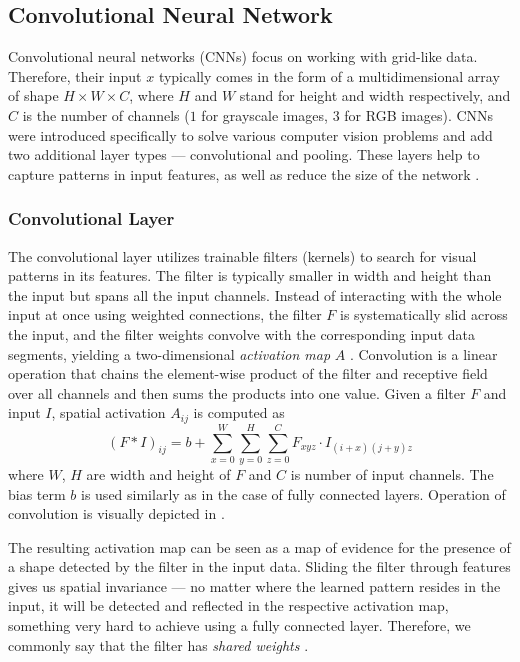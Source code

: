 \subsection*{Convolutional Neural Network}
Convolutional neural networks (CNNs) focus on working with grid-like data.
Therefore, their input $x$ typically comes in the form of a multidimensional array of shape $H \times W \times C$, where $H$ and $W$ stand for height and width respectively, and $C$ is the number of channels ($1$ for grayscale images, $3$ for RGB images).
CNNs were introduced specifically to solve various computer vision problems and add two additional layer types --- convolutional and pooling.
These layers help to capture patterns in input features, as well as reduce the size of the network \cite{cnns}. 


\subsubsection{Convolutional Layer}

The convolutional layer utilizes trainable filters (kernels) to search for visual patterns in its features.
The filter is typically smaller in width and height than the input but spans all the input channels.
Instead of interacting with the whole input at once using weighted connections, the filter $F$ is systematically slid across the input, and the filter weights convolve with the corresponding input data segments, yielding a two-dimensional \emph{activation map} $A$ \cite{goodfellow}.
Convolution is a linear operation that chains the element-wise product of the filter and receptive field over all channels and then sums the products into one value. Given a filter $F$ and input $I$, spatial activation $A_{ij}$ is computed as 
\begin{equation}
    (F * I)_{ij} = b + \sum_{x=0}^{W} \sum_{y=0}^{H} \sum_{z=0}^{C} F_{xyz} \cdot I_{(i+x)(j+y)z}
\end{equation}
where $W$, $H$ are width and height of $F$ and $C$ is number of input channels. The bias term $b$ is used similarly as in the case of fully connected layers. Operation of convolution is visually depicted in .

The resulting activation map can be seen as a map of evidence for the presence of a shape detected by the filter in the input data.
Sliding the filter through features gives us spatial invariance --- no matter where the learned pattern resides in the input, it will be detected and reflected in the respective activation map, something very hard to achieve using a fully connected layer.
Therefore, we commonly say that the filter has \emph{shared weights} \cite{goodfellow}.

